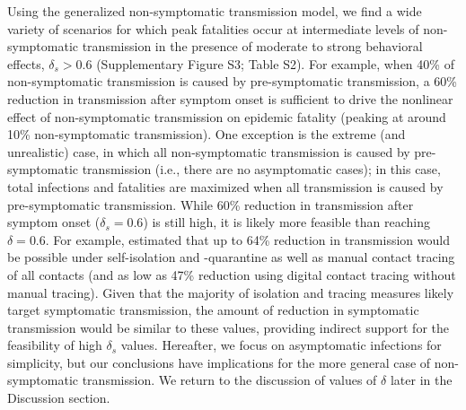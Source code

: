 \documentclass[12pt]{article}
\begin{document}
Using the generalized non-symptomatic transmission model, we find a wide variety of scenarios for which peak fatalities occur at intermediate levels of non-symptomatic transmission in the presence of moderate to strong behavioral effects, $\delta_s > 0.6$ (Supplementary Figure S3; Table S2).
For example, when 40\% of non-symptomatic transmission is caused by pre-symptomatic transmission, a 60\% reduction in transmission after symptom onset is sufficient to drive the nonlinear effect of non-symptomatic transmission on epidemic fatality (peaking at around 10\% non-symptomatic transmission).
One exception is the extreme (and unrealistic) case, in which all non-symptomatic transmission is caused by pre-symptomatic transmission (i.e., there are no asymptomatic cases);
in this case, total infections and fatalities are maximized when all transmission is caused by pre-symptomatic transmission. 
While 60\% reduction in transmission after symptom onset ($\delta_s = 0.6$) is still high, it is likely more feasible than reaching $\delta = 0.6$.
For example, \cite{kucharski2020effectiveness} estimated that up to 64\% reduction in transmission would be possible under self-isolation and -quarantine as well as manual contact tracing of all contacts (and as low as 47\% reduction using digital contact tracing without manual tracing).
Given that the majority of isolation and tracing measures likely target symptomatic transmission, the amount of reduction in symptomatic transmission would be similar to these values, providing indirect support for the feasibility of high $\delta_s$ values. 
Hereafter, we focus on asymptomatic infections for simplicity, but our conclusions have implications for the more general case of non-symptomatic transmission.
We return to the discussion of values of $\delta$ later in the Discussion section.
\end{document}
